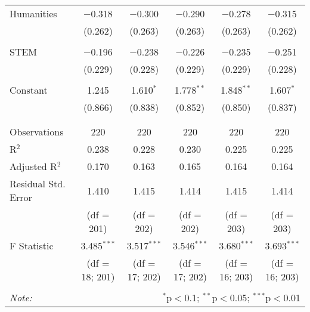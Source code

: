 \begin{table}[H]
\begin{adjustbox}{width=\textwidth, totalheight=\baselineskip}
\begin{tabular}{@{\extracolsep{5pt}}lccccc}
 Humanities & $-$0.318 & $-$0.300 & $-$0.290 & $-$0.278 & $-$0.315 \\ 
  & (0.262) & (0.263) & (0.263) & (0.263) & (0.262) \\ 
  & & & & & \\ 
 STEM & $-$0.196 & $-$0.238 & $-$0.226 & $-$0.235 & $-$0.251 \\ 
  & (0.229) & (0.228) & (0.229) & (0.229) & (0.228) \\ 
  & & & & & \\ 
 Constant & 1.245 & 1.610$^{*}$ & 1.778$^{**}$ & 1.848$^{**}$ & 1.607$^{*}$ \\ 
  & (0.866) & (0.838) & (0.852) & (0.850) & (0.837) \\ 
  & & & & & \\ 
\hline \\[-1.8ex] 
Observations & 220 & 220 & 220 & 220 & 220 \\ 
R$^{2}$ & 0.238 & 0.228 & 0.230 & 0.225 & 0.225 \\ 
Adjusted R$^{2}$ & 0.170 & 0.163 & 0.165 & 0.164 & 0.164 \\ 
Residual Std. Error & 1.410  & 1.415  & 1.414  & 1.415 & 1.414  \\ 
& (df = 201) & (df = 202) & (df = 202) & (df = 203) & (df = 203) \\
F Statistic & 3.485$^{***}$  & 3.517$^{***}$ & 3.546$^{***}$  & 3.680$^{***}$  & 3.693$^{***}$  \\ 
& (df = 18; 201) & (df = 17; 202) & (df = 17; 202) & (df = 16; 203) & (df = 16; 203) \\
\hline 
\hline \\[-1.8ex] 
\textit{Note:}  & \multicolumn{5}{r}{$^{*}$p$<$0.1; $^{**}$p$<$0.05; $^{***}$p$<$0.01} \\ 
\end{tabular} 
\end{adjustbox}
\end{table} 

  



